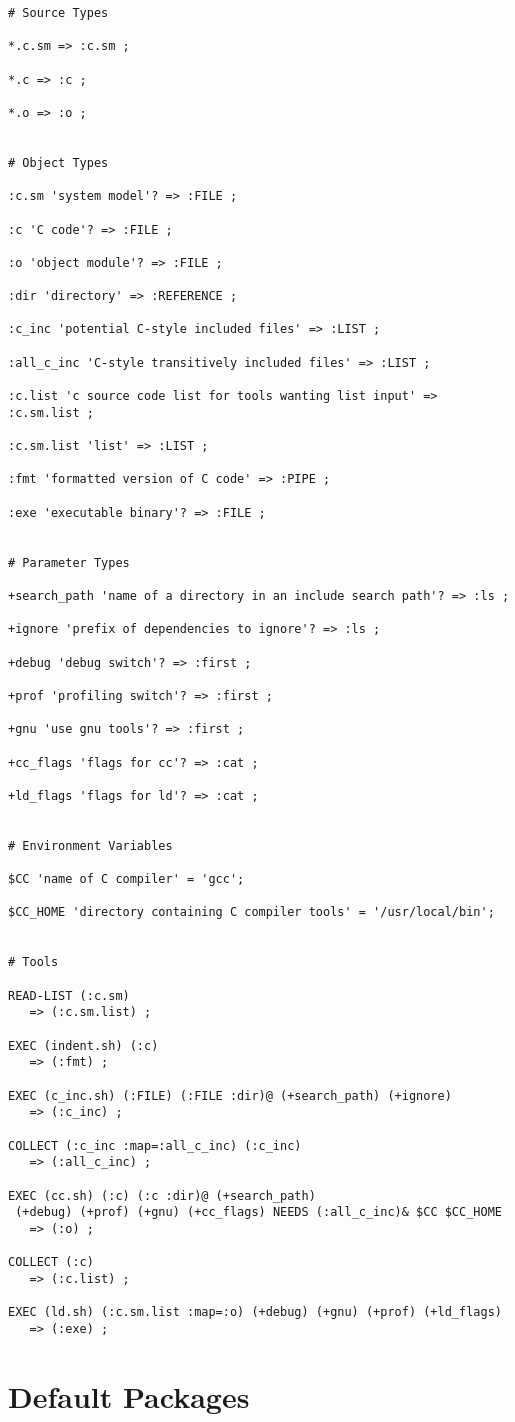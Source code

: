 \begin{verbatim}
# Source Types

*.c.sm => :c.sm ;

*.c => :c ;

*.o => :o ;


# Object Types

:c.sm 'system model'? => :FILE ;

:c 'C code'? => :FILE ;

:o 'object module'? => :FILE ;

:dir 'directory' => :REFERENCE ;

:c_inc 'potential C-style included files' => :LIST ;

:all_c_inc 'C-style transitively included files' => :LIST ;

:c.list 'c source code list for tools wanting list input' => :c.sm.list ;

:c.sm.list 'list' => :LIST ;

:fmt 'formatted version of C code' => :PIPE ;

:exe 'executable binary'? => :FILE ;


# Parameter Types

+search_path 'name of a directory in an include search path'? => :ls ;

+ignore 'prefix of dependencies to ignore'? => :ls ;

+debug 'debug switch'? => :first ;

+prof 'profiling switch'? => :first ;

+gnu 'use gnu tools'? => :first ;

+cc_flags 'flags for cc'? => :cat ;

+ld_flags 'flags for ld'? => :cat ;


# Environment Variables

$CC 'name of C compiler' = 'gcc';

$CC_HOME 'directory containing C compiler tools' = '/usr/local/bin';


# Tools

READ-LIST (:c.sm)
   => (:c.sm.list) ;

EXEC (indent.sh) (:c)
   => (:fmt) ;
 
EXEC (c_inc.sh) (:FILE) (:FILE :dir)@ (+search_path) (+ignore)
   => (:c_inc) ;

COLLECT (:c_inc :map=:all_c_inc) (:c_inc)
   => (:all_c_inc) ;

EXEC (cc.sh) (:c) (:c :dir)@ (+search_path)
 (+debug) (+prof) (+gnu) (+cc_flags) NEEDS (:all_c_inc)& $CC $CC_HOME
   => (:o) ;

COLLECT (:c)
   => (:c.list) ;

EXEC (ld.sh) (:c.sm.list :map=:o) (+debug) (+gnu) (+prof) (+ld_flags)
   => (:exe) ;
\end{verbatim}

\chapter{Default Packages}







